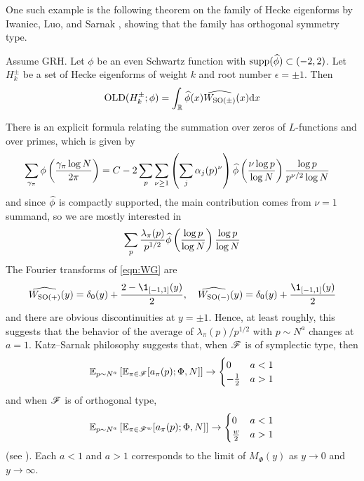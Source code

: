 One such example is the following theorem on the family of Hecke eigenforms by Iwaniec, Luo, and Sarnak \cite{iwaniec2000low}, showing that the family has orthogonal symmetry type.
\begin{theorem}
    Assume GRH. Let $\phi$ be an even Schwartz function with $\mathrm{supp}(\widehat{\phi}) \subset (-2, 2)$.
    Let $H_k^\pm$ be a set of Hecke eigenforms of weight $k$ and root number $\epsilon = \pm 1$.
    Then
    \begin{equation}
        \mathrm{OLD}(H_k^\pm; \phi) = \int_{\mathbb{R}} \widehat{\phi}(x) \widehat{W_{\mathrm{SO}(\pm)}}(x) \mathrm{d} x
    \end{equation}
\end{theorem}
There is an explicit formula relating the summation over zeros of $L$-functions and over primes, which is given by \cite[Section 4]{iwaniec2000low}
\begin{align*}
    \sum_{\gamma_\pi} \phi\left(\frac{\gamma_\pi \log N}{2\pi}\right) &= C - 2 \sum_p \sum_{\nu \ge 1} \left(\sum_{j} \alpha_j(p)^\nu\right) \widehat{\phi}\left(\frac{\nu \log p}{\log N}\right) \frac{\log p}{p^{\nu/2} \log N}
\end{align*}
and since $\widehat{\phi}$ is compactly supported, the main contribution comes from $\nu = 1$ summand, so we are mostly interested in 
\begin{equation}
    \sum_{p} \frac{\lambda_\pi(p)}{p^{1/2}} \widehat{\phi}\left(\frac{\log p}{\log N}\right) \frac{\log p}{\log N} 
\end{equation}
The Fourier transforms of \eqref{eqn:WG} are
\begin{equation}
    \what{W_{\SO(+)}}(y) = \delta_0(y) + \frac{2 - \1_{[-1, 1]}(y)}{2}, \quad \what{W_{\SO(-)}}(y) = \delta_0(y) + \frac{\1_{[-1, 1]}(y)}{2}
\end{equation}
and there are obvious discontinuities at $y = \pm 1$.
Hence, at least roughly, this suggests that the behavior of the average of $\lambda_\pi(p) / p^{1/2}$ with $p \sim N^a$ changes at $a = 1$.
Katz--Sarnak philosophy suggests that, when $\mathscr{F}$ is of symplectic type, then
\[
\mathbb{E}_{p \sim N^a} \left[ \mathbb{E}_{\pi \in \mathscr{F}} [a_\pi(p); \Phi, N]\right] \to \begin{cases}
    0 & a < 1 \\ -\frac{1}{2} & a > 1
\end{cases}
\]
and when $\mathscr{F}$ is of orthogonal type,
\[
\mathbb{E}_{p \sim N^a} \left[ \mathbb{E}_{\pi \in \mathscr{F}^w} [a_\pi(p); \Phi, N]\right] \to \begin{cases}
    0 & a < 1 \\ \frac{w}{2} & a > 1
\end{cases}
\]
(see \cite[eq. (7')]{sarnak}).
Each $a < 1$ and $a > 1$ corresponds to the limit of $M_\Phi(y)$ as $y \to 0$ and $y \to \infty$.




